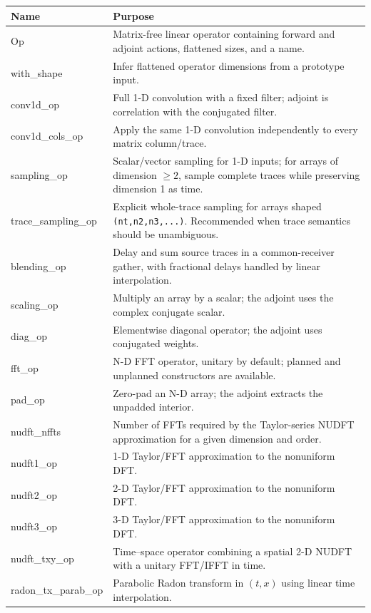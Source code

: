 \documentclass[11pt]{article}
\begin{document}
\renewcommand{\arraystretch}{1.18}
\begin{longtable}{>{\ttfamily}p{}p{}}
\toprule
\normalfont Name & Purpose \\
\midrule
\endhead
Op & Matrix-free linear operator containing forward and adjoint actions, flattened sizes, and a name. \\
with\_shape & Infer flattened operator dimensions from a prototype input. \\
conv1d\_op & Full 1-D convolution with a fixed filter; adjoint is correlation with the conjugated filter. \\
conv1d\_cols\_op & Apply the same 1-D convolution independently to every matrix column/trace. \\
sampling\_op & Scalar/vector sampling for 1-D inputs; for arrays of dimension $\ge 2$, sample complete traces while preserving dimension 1 as time. \\
trace\_sampling\_op & Explicit whole-trace sampling for arrays shaped \texttt{(nt,n2,n3,...)}. Recommended when trace semantics should be unambiguous. \\
blending\_op & Delay and sum source traces in a common-receiver gather, with fractional delays handled by linear interpolation. \\
scaling\_op & Multiply an array by a scalar; the adjoint uses the complex conjugate scalar. \\
diag\_op & Elementwise diagonal operator; the adjoint uses conjugated weights. \\
fft\_op & N-D FFT operator, unitary by default; planned and unplanned constructors are available. \\
pad\_op & Zero-pad an N-D array; the adjoint extracts the unpadded interior. \\
nudft\_nffts & Number of FFTs required by the Taylor-series NUDFT approximation for a given dimension and order. \\
nudft1\_op & 1-D Taylor/FFT approximation to the nonuniform DFT. \\
nudft2\_op & 2-D Taylor/FFT approximation to the nonuniform DFT. \\
nudft3\_op & 3-D Taylor/FFT approximation to the nonuniform DFT. \\
nudft\_txy\_op & Time--space operator combining a spatial 2-D NUDFT with a unitary FFT/IFFT in time. \\
radon\_tx\_parab\_op & Parabolic Radon transform in $(t,x)$ using linear time interpolation. \\

\end{longtable}
\end{document}
